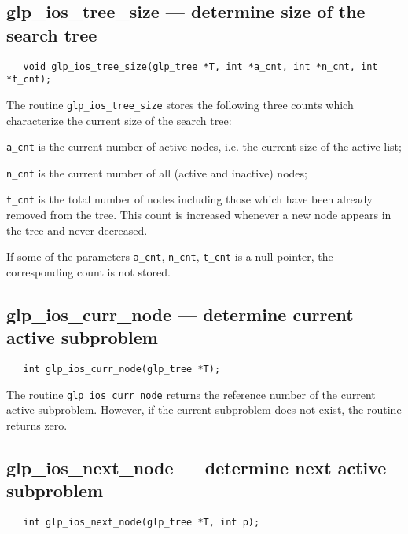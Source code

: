 \subsection{glp\_ios\_tree\_size --- determine size of the search tree}

\synopsis

\begin{verbatim}
   void glp_ios_tree_size(glp_tree *T, int *a_cnt, int *n_cnt, int *t_cnt);
\end{verbatim}

\description

The routine \verb|glp_ios_tree_size| stores the following three counts
which characterize the current size of the search tree:

\verb|a_cnt| is the current number of active nodes, i.e. the current
size of the active list;

\verb|n_cnt| is the current number of all (active and inactive) nodes;

\verb|t_cnt| is the total number of nodes including those which have
been already removed from the tree. This count is increased whenever
a new node appears in the tree and never decreased.

If some of the parameters \verb|a_cnt|, \verb|n_cnt|, \verb|t_cnt| is
a null pointer, the corresponding count is not stored.

\subsection{glp\_ios\_curr\_node --- determine current active
subproblem}

\synopsis

\begin{verbatim}
   int glp_ios_curr_node(glp_tree *T);
\end{verbatim}

\returns

The routine \verb|glp_ios_curr_node| returns the reference number of
the current active subproblem. However, if the current subproblem does
not exist, the routine returns zero.

\subsection{glp\_ios\_next\_node --- determine next active subproblem}

\synopsis

\begin{verbatim}
   int glp_ios_next_node(glp_tree *T, int p);
\end{verbatim}

